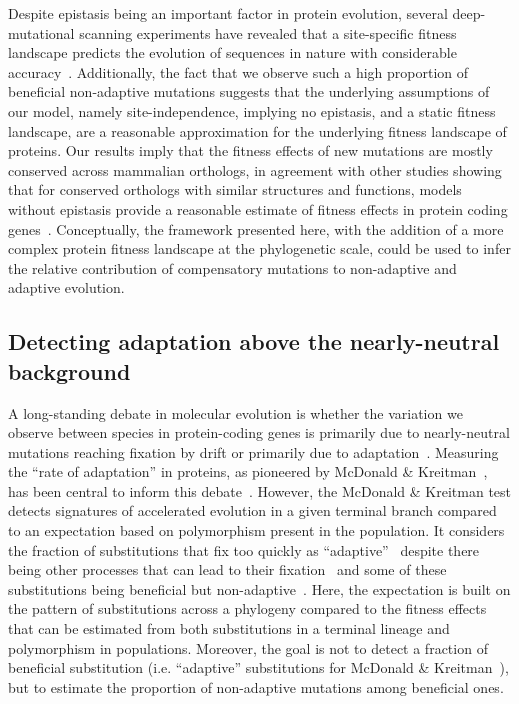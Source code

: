 \documentclass{article}
\begin{document}
    Despite epistasis being an important factor in protein evolution, several deep-mutational scanning experiments have revealed that a site-specific fitness landscape predicts the evolution of sequences in nature with considerable accuracy~\cite{ashenberg_mutational_2013, doud_sitespecific_2015, bloom_identification_2017}.
    Additionally, the fact that we observe such a high proportion of beneficial non-adaptive mutations suggests that the underlying assumptions of our model, namely site-independence, implying no epistasis, and a static fitness landscape, are a reasonable approximation for the underlying fitness landscape of proteins.
    Our results imply that the fitness effects of new mutations are mostly conserved across mammalian orthologs, in agreement with other studies showing that for conserved orthologs with similar structures and functions, models without epistasis provide a reasonable estimate of fitness effects in protein coding genes~\cite{youssef_consequences_2020, vigue_deciphering_2022}.
    Conceptually, the framework presented here, with the addition of a more complex protein fitness landscape at the phylogenetic scale, could be used to infer the relative contribution of compensatory mutations to non-adaptive and adaptive evolution.

    \subsection*{Detecting adaptation above the nearly-neutral background}

    A long-standing debate in molecular evolution is whether the variation we observe between species in protein-coding genes is primarily due to nearly-neutral mutations reaching fixation by drift or primarily due to adaptation~\cite{kimura_evolutionary_1968,ohta_nearly_1992,gillespie_substitution_1994,jensen_importance_2019}.
    Measuring the ``rate of adaptation'' in proteins, as pioneered by McDonald \& Kreitman~\cite{mcdonald_adaptative_1991}, has been central to inform this debate~\cite{galtier_half_2024}.
    However, the McDonald \& Kreitman test detects signatures of accelerated evolution in a given terminal branch compared to an expectation based on polymorphism present in the population. It considers the fraction of substitutions that fix too quickly as ``adaptive''~\cite{mcdonald_adaptative_1991, smith_adaptive_2002, welch_estimating_2006} despite there being other processes that can lead to their fixation~\cite{galtier_adaptation_2007,rousselle_influence_2019,joseph_increased_2024a} and some of these substitutions being beneficial but non-adaptive~\cite{hartl_compensatory_1996, charlesworth_other_2007, mustonen_fitness_2009, jones_shifting_2017}.
    Here, the expectation is built on the pattern of substitutions across a phylogeny compared to the fitness effects that can be estimated from both substitutions in a terminal lineage and polymorphism in populations.
    Moreover, the goal is not to detect a fraction of beneficial substitution (i.e. ``adaptive'' substitutions for McDonald \& Kreitman~\cite{mcdonald_adaptative_1991}), but to estimate the proportion of non-adaptive mutations among beneficial ones.
\end{document}
